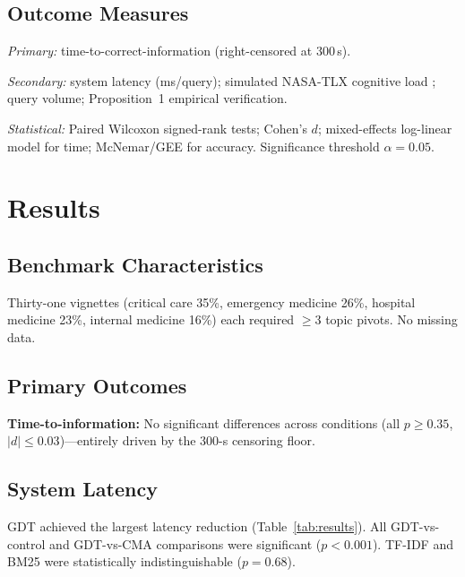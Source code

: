\documentclass[journal,10pt,twoside]{IEEEtran}
\begin{document}
\subsection{Outcome Measures}

\textit{Primary:} time-to-correct-information (right-censored at 300\,s).

\textit{Secondary:} system latency (ms/query); simulated NASA-TLX cognitive load \cite{hart1988}; query volume; Proposition~1 empirical verification.

\textit{Statistical:} Paired Wilcoxon signed-rank tests; Cohen's $d$; mixed-effects log-linear model for time; McNemar/GEE for accuracy. Significance threshold $\alpha{=}0.05$.

\section{Results}
\label{sec:results}

\subsection{Benchmark Characteristics}

Thirty-one vignettes (critical care 35\%, emergency medicine 26\%, hospital medicine 23\%, internal medicine 16\%) each required $\geq$3 topic pivots. No missing data.

\subsection{Primary Outcomes}

\textbf{Time-to-information:} No significant differences across conditions (all $p{\geq}0.35$, $|d|{\leq}0.03$)---entirely driven by the 300-s censoring floor.

\subsection{System Latency}

GDT achieved the largest latency reduction (Table~\ref{tab:results}). All GDT-vs-control and GDT-vs-CMA comparisons were significant ($p{<}0.001$). TF-IDF and BM25 were statistically indistinguishable ($p{=}0.68$).
\end{document}
